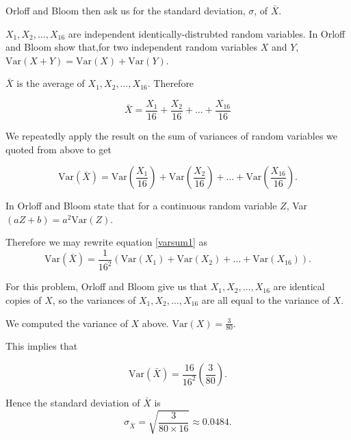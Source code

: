 \documentclass[a4paper,11pt]{article}
\begin{document}
Orloff and Bloom then ask us for the
standard deviation, $\sigma$, of
$\bar{X}$.

$X_1, X_2, \ldots, X_16$ are independent identically-distrubted random
variables.  In \cite{reading6b} Orloff and Bloom show that,for two independent
random variables $X$ and $Y$, $\text{Var}\left( X + Y \right) =
\text{Var}\left( X \right) + \text{Var}\left( Y \right)$.

$\bar{X}$ is the average of $X_1, X_2, \ldots, X_16$.  Therefore

\begin{equation}
\bar{X} = \frac{X_1}{16} + \frac{X_2}{16} + \ldots + \frac{X_{16}}{16}
\end{equation}

We repeatedly apply the result on the sum of variances of random variables
we quoted from \cite{reading6b} above to get

\begin{equation} \label{varsum1}
\text{Var}\left(\bar{X}\right) = \text{Var}\left(\frac{X_1}{16}\right)
 + \text{Var}\left(\frac{X_2}{16}\right) + \ldots +
 \text{Var}\left(\frac{X_{16}}{16}\right).
\end{equation}

In \cite{reading6a} Orloff and Bloom state that for
a continuous random variable $Z$,
Var$\left(aZ + b \right)=a^2\text{Var}\left(Z\right)$.

Therefore we may rewrite equation \ref{varsum1} as
\begin{equation} \label{varsum2}
\text{Var}\left(\bar{X}\right) = \frac{1}{16^2}\left(\text{Var}\left(X_1\right)
 + \text{Var}\left(X_2\right) + \ldots +
 \text{Var}\left(X_16\right)\right).
\end{equation}

For this problem, Orloff and Bloom give us that
$X_1 , X_2 , \ldots , X_16$ are identical copies
of $X$, so the variances of $X_1 , X_2 , \ldots , X_16$
are all equal to the variance of $X$.

We computed the variance of $X$ above.
$\text{Var}\left(X \right)=\frac{3}{80}$.

This implies that

\begin{equation}
\text{Var}\left(\bar{X}\right) = \frac{16}{16^2}\left(\frac{3}{80}\right).
\end{equation}

Hence the standard deviation of $\bar{X}$ is
\begin{equation}
\sigma_{\bar{X}} = \sqrt{\frac{3}{80\times16}} \approx 0.0484.
\end{equation}
\end{document}
